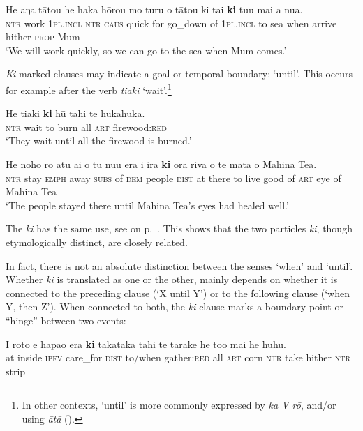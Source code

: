 \ea\label{ex:11.195}
\gll He aŋa tātou he haka hōrou mo turu o tātou ki tai  \textbf{ki} tu{\ꞌ}u mai a nua.\\
\textsc{ntr} work \textsc{1pl.incl} \textsc{ntr} \textsc{caus} quick for go\_down of \textsc{1pl.incl} to sea  when arrive hither \textsc{prop} Mum\\

\glt 
‘We will work quickly, so we can go to the sea when Mum comes.’ \textstyleExampleref{[R229.456]} 
\z

\textit{Ki}{}-marked clauses may indicate a goal or temporal boundary: ‘until’. This occurs for example after the verb \textit{tiaki} ‘wait’.\footnote{\label{fn:526}In other contexts, ‘until’ is more commonly expressed by \textit{ka V rō}, and/or using \textit{{\ꞌ}ātā} ().}

\ea\label{ex:11.196}
\gll He tiaki \textbf{ki} hū tahi te hukahuka. \\
\textsc{ntr} wait to burn all \textsc{art} firewood:\textsc{red} \\

\glt 
‘They wait until all the firewood is burned.’ \textstyleExampleref{[R333.460]} 
\z

\ea\label{ex:11.197}
\gll He noho rō atu {\ꞌ}ai o tū nu{\ꞌ}u era {\ꞌ}i ira \textbf{ki} ora riva o te mata o Māhina Tea.\\
\textsc{ntr} stay \textsc{emph} away \textsc{subs} of \textsc{dem} people \textsc{dist} at there to live good of \textsc{art} eye of Mahina Tea\\

\glt
‘The people stayed there until Mahina Tea’s eyes had healed well.’ \textstyleExampleref{[R399.235]} 
\z

The  \textit{ki} has the same use, see  on p.~\pageref{ex:4.266}. This shows that the two particles \textit{ki}, though etymologically distinct, are closely related.

In fact, there is not an absolute distinction between the senses ‘when’ and ‘until’. Whether \textit{ki} is translated as one or the other, mainly depends on whether it is connected to the preceding clause (‘X until Y’) or to the following clause (‘when Y, then Z’). When connected to both, the \textit{ki}{}-clause marks a boundary point or “hinge” between two events:

\ea\label{ex:11.198}
\gll {\ꞌ}I roto e hāpa{\ꞌ}o era \textbf{ki} takataka tahi te tarake  he to{\ꞌ}o mai he huhu.\\
at inside \textsc{ipfv} care\_for \textsc{dist} to/when gather:\textsc{red} all \textsc{art} corn  \textsc{ntr} take hither \textsc{ntr} strip\\


